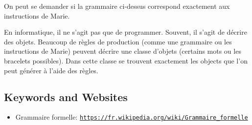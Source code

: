 \documentclass[a4paper,11pt]{report}
\newcommand{\BrochureUrlText}[1]{\texttt{#1}}
\begin{document}
On peut se demander si la grammaire ci-dessus correspond exactement aux instructions de Marie.

En informatique, il ne s’agit pas que de programmer. Souvent, il s’agit de décrire des objets. Beaucoup de règles de production (comme une grammaire ou les instructions de Marie) peuvent décrire une classe d’objets (certains mots ou les bracelets possibles). Dans cette classe se trouvent exactement les objects que l’on peut générer à l’aide des règles.

{\raggedright

\subsection*{Keywords and Websites}

\begin{itemize}
  \item Grammaire formelle: \href{https://fr.wikipedia.org/wiki/Grammaire_formelle}{\BrochureUrlText{https://fr.wikipedia.org/wiki/Grammaire\_formelle}}
\end{itemize}


}
\end{document}
